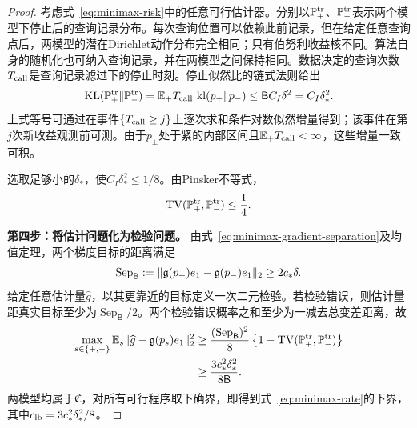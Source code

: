 \begin{proof}
考虑式~\eqref{eq:minimax-risk}中的任意可行估计器。分别以$\mathbb P_+^{\rm tr}$、$\mathbb P_-^{\rm tr}$表示两个模型下停止后的查询记录分布。每次查询位置可以依赖此前记录，但在给定任意查询点后，两模型的潜在Dirichlet动作分布完全相同；只有伯努利收益核不同。算法自身的随机化也可纳入查询记录，并在两模型之间保持相同。数据决定的查询次数$T_{\rm call}$是查询记录滤过下的停止时刻。停止似然比的链式法则给出
\begin{equation}\label{eq:stopped-transcript-kl}
 \operatorname{KL}(\mathbb P_+^{\rm tr}\Vert\mathbb P_-^{\rm tr})
 =\mathbb E_+T_{\rm call}\,\operatorname{kl}(p_+\Vert p_-)
 \le \mathsf B C_I\delta^2=C_I\delta_*^2.
\end{equation}
上式等号可通过在事件$\{T_{\rm call}\ge j\}$上逐次求和条件对数似然增量得到；该事件在第$j$次新收益观测前可测。由于$p_\pm$处于紧的内部区间且$\mathbb E_+T_{\rm call}<\infty$，这些增量一致可积。

选取足够小的$\delta_*$，使$C_I\delta_*^2\le1/8$。由Pinsker不等式，
\begin{equation}\label{eq:minimax-tv}
 \operatorname{TV}(\mathbb P_+^{\rm tr},\mathbb P_-^{\rm tr})\le\frac14.
\end{equation}

\par\smallskip\noindent\textbf{第四步：将估计问题化为检验问题。}\quad
由式~\eqref{eq:minimax-gradient-separation}及均值定理，两个梯度目标的距离满足
\begin{equation}\label{eq:minimax-target-distance}
 \operatorname{Sep}_{\mathsf B}
 :=\lVert\mathfrak g(p_+)e_1-\mathfrak g(p_-)e_1\rVert_2
 \ge2c_*\delta.
\end{equation}
给定任意估计量$\widehat g$，以其更靠近的目标定义一次二元检验。若检验错误，则估计量距真实目标至少为$\operatorname{Sep}_{\mathsf B}/2$。两个检验错误概率之和至少为一减去总变差距离，故
\begin{align*}
 \max_{s\in\{+,-\}}
 \mathbb E_s\lVert\widehat g-\mathfrak g(p_s)e_1\rVert_2^2
 &\ge \frac{(\operatorname{Sep}_{\mathsf B})^2}{8}
 \left\{1-\operatorname{TV}(\mathbb P_+^{\rm tr},\mathbb P_-^{\rm tr})\right\}\\
 &\ge \frac{3c_*^2\delta_*^2}{8\mathsf B}.
\end{align*}
两模型均属于$\mathfrak C$，对所有可行程序取下确界，即得到式~\eqref{eq:minimax-rate}的下界，其中$c_{\rm lb}=3c_*^2\delta_*^2/8$。


\end{proof}
